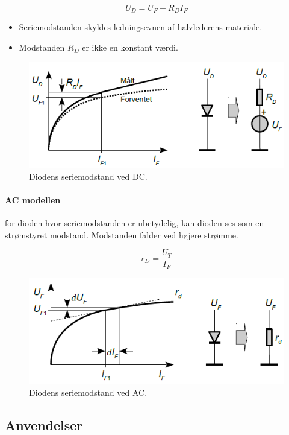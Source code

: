 \documentclass[danish]{article}
\begin{document}
\begin{equation}
U_D = U_F + R_D I_F
\end{equation}

\begin{itemize}
	\item Seriemodstanden skyldes ledningsevnen af halvlederens materiale.
	\item Modstanden $R_D$ er ikke en konstant værdi.
\end{itemize}

\begin{figure} [H]
	\centering
	\includegraphics[width=0.9\linewidth]{graphics/DC_diode}
	\caption{Diodens seriemodstand ved DC.}
	\label{fig:DC_diode}
\end{figure}

\newpage
\paragraph{AC modellen} for dioden hvor seriemodstanden er ubetydelig, kan dioden ses som en strømstyret modstand. 
Modstanden falder ved højere strømme.

\begin{equation}
r_D = \dfrac{U_T}{I_F}
\end{equation}

\begin{figure} [H]
	\centering
	\includegraphics[width=0.8\linewidth]{graphics/ACdiode}
	\caption{Diodens seriemodstand ved AC.}
	\label{fig:AC_diode}
\end{figure}

\subsection{Anvendelser}
\end{document}

